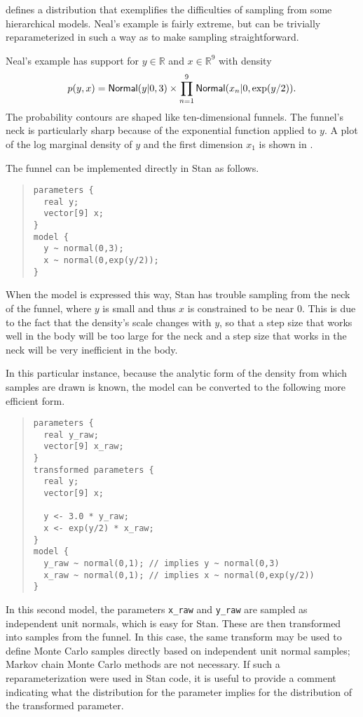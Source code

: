 \citep{Neal:2003} defines a distribution that exemplifies the
difficulties of sampling from some hierarchical models.  Neal's
example is fairly extreme, but can be trivially reparameterized in
such a way as to make sampling straightforward.

Neal's example has support for $y \in
\mathbb{R}$ and  $x \in \mathbb{R}^9$ with density
%
\[
p(y,x) = \mbox{\sf Normal}(y|0,3) \times \prod_{n=1}^9
\mbox{\sf Normal}(x_n|0,\exp(y/2)).
\]
%
The probability contours are shaped like ten-dimensional funnels.  The
funnel's neck is particularly sharp because of the exponential
function applied to $y$.  A plot of the log marginal density of $y$
and the first dimension $x_1$ is shown in .

The funnel can be implemented directly in Stan as follows.
%
\begin{quote}
\begin{Verbatim}[fontsize=\small]
parameters {  
  real y;
  vector[9] x;
}
model {
  y ~ normal(0,3);
  x ~ normal(0,exp(y/2));
}
\end{Verbatim}
\end{quote}
%
When the model is expressed this way, Stan has trouble sampling from
the neck of the funnel, where $y$ is small and thus $x$ is constrained
to be near 0.  This is due to the fact that the density's scale
changes with $y$, so that a step size that works well in the body will
be too large for the neck and a step size that works in the neck will be
very inefficient in the body.

In this particular instance, because the analytic form of the density
from which samples are drawn is known, the model can be converted to
the following more efficient form.
%
\begin{quote}
\begin{Verbatim}[fontsize=\small]
parameters {  
  real y_raw;
  vector[9] x_raw;
}
transformed parameters {
  real y;
  vector[9] x;

  y <- 3.0 * y_raw;  
  x <- exp(y/2) * x_raw;
}
model {
  y_raw ~ normal(0,1); // implies y ~ normal(0,3) 
  x_raw ~ normal(0,1); // implies x ~ normal(0,exp(y/2))  
}
\end{Verbatim}
\end{quote}
%
In this second model, the parameters \Verb|x_raw| and \Verb|y_raw| are
sampled as independent unit normals, which is easy for Stan.  These
are then transformed into samples from the funnel.  In this case, the
same transform may be used to define Monte Carlo samples directly
based on independent unit normal samples; Markov chain Monte Carlo
methods are not necessary. If such a reparameterization were used in
Stan code, it is useful to provide a comment indicating what the
distribution for the parameter implies for the distribution of the
transformed parameter.

